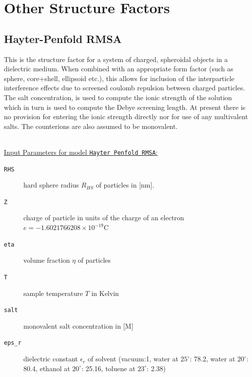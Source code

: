\clearpage
\section{Other Structure Factors}

\subsection{Hayter-Penfold RMSA \cite{Hayter1981,Hansen1982}}

This is the structure factor for a system of charged, spheroidal objects in a dielectric
medium. When
combined with an appropriate form factor (such as sphere, core+shell, ellipsoid etc.),
this allows for inclusion of the interparticle interference effects due to screened
coulomb repulsion between charged particles.
The salt concentration, is used to compute the ionic strength of the solution which
in turn is used to compute the Debye screening length. At present there is no provision
for entering the ionic strength directly nor for use of any multivalent salts. The
counterions are also assumed to be monovalent.



\hspace{1pt}\\
\underline{Input Parameters for model \texttt{Hayter Penfold RMSA}:}\\
\begin{description}
\item[\texttt{RHS}] hard sphere radius $R_{HS}$ of particles in [nm].
\item[\texttt{Z}] charge of particle in units of the charge of an electron $e=-1.602 176 620 8 \times 10^{-19} \mathrm{C}$
\item[\texttt{eta}] volume fraction $\eta$ of particles
\item[\texttt{T}] sample temperature $T$ in Kelvin
\item[\texttt{salt}] monovalent salt concentration in [M]
\item[\texttt{eps\_r}] dielectric constant $\epsilon_r$ of solvent (vacuum:1, water at $25^\circ$: 78.2, water at $20^\circ$: 80.4, ethanol at $20^\circ$: 25.16, toluene at $23^\circ$: 2.38)
\end{description}


